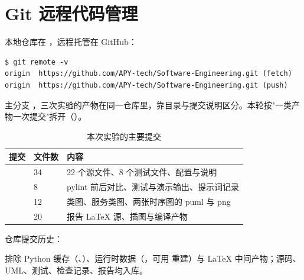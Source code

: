 \section{Git 远程代码管理}

本地仓库在 ，远程托管在 GitHub：

\begin{lstlisting}
$ git remote -v
origin  https://github.com/APY-tech/Software-Engineering.git (fetch)
origin  https://github.com/APY-tech/Software-Engineering.git (push)
\end{lstlisting}

主分支 ，三次实验的产物在同一仓库里，靠目录与提交说明区分。本轮按"一类产物一次提交"拆开（）。

\begin{table}[htbp]
\centering
\caption{本次实验的主要提交}\label{tab:commits}
\renewcommand{\arraystretch}{1.15}
\begin{tabularx}{\textwidth}{@{}L{1.8cm}L{1.5cm}Y@{}}
\toprule
提交 & 文件数 & 内容 \\
\midrule
{} & 34 & 22 个源文件、8 个测试文件、配置与说明 \\
 & 8 & pylint 前后对比、测试与演示输出、提示词记录 \\
 & 12 & 类图、服务类图、两张时序图的 puml 与 png \\
 & 20 & 报告 LaTeX 源、插图与编译产物 \\
\bottomrule
\end{tabularx}
\end{table}

仓库提交历史：



 排除 Python 缓存（、）、运行时数据（，可用  重建）与 LaTeX 中间产物；源码、UML、测试、检查记录、报告均入库。
